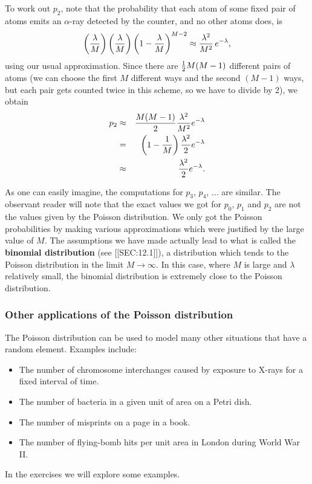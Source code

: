 {{{{To work out $p_2$, note that the probability that each atom of some fixed 
pair of atoms emits an $\alpha$-ray detected by the counter, and no other 
atoms does, is 
\[
\left( \lambda\over M\right) \left( \lambda\over M\right)
\left(1-{\lambda\over M}\right)^{M-2}\approx {\lambda ^2\over M^2}\, e^{-\lambda},
\]
using our usual approximation.  Since there are ${1\over 2}M(M-1)$  different pairs of atoms (we can  choose the first  $M$ different ways and the second $(M-1)$ ways, but  each pair gets counted twice in this scheme, so we have to divide by 2),  we obtain
\begin{eqnarray*}
	p_2 & \approx & {M(M-1)\over 2}
		{\lambda ^2\over M^2}e^{-\lambda}\\
	& = & \left( 1 - {1\over M}\right)
		{\lambda ^2\over 2}e^{-\lambda}\\
	&\approx & {\lambda ^2\over 2}e^{-\lambda}.
\end{eqnarray*}

As one can easily imagine, the computations for $p_3$, $p_4$, $\ldots$  are similar.  The observant reader will note that the exact values we got for $p_0$, $p_1$ and  $p_2$  are not the values given by  the Poisson distribution.  We only got the Poisson probabilities by making various approximations which were justified by the large value of $M$.  The assumptions we have made actually lead  to what is called the {\bf binomial distribution} (see [[SEC:12.1]]), a distribution which tends to the Poisson distribution in the limit $M\rightarrow\infty$.  In this case, where  $M$ is large and $\lambda$ relatively small, the binomial distribution is extremely close to the Poisson distribution.
 
\subsubsection{Other applications of the Poisson distribution}

        The Poisson distribution can be used to model many other
situations that have a random element.  Examples include:
\begin{itemize}
\item The number of chromosome interchanges caused by exposure to
X-rays for a fixed interval of time.
\item The number of bacteria in a given unit of area on a Petri dish.
\item The number of misprints on a page in a book.
\item The number of flying-bomb hits per unit area in London during
World War II.
\end{itemize}
In the exercises we will explore some examples.



}}}}
